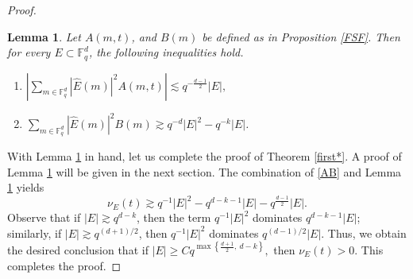 \documentclass[10pt,a4paper]{amsart}
\newtheorem{lemma}{Lemma}
\def\Fq#1{\mathbb{F}_q^{#1}}
\def\pnorm#1#2{|#2|_{#1}}
\begin{document}
\begin{proof}
\begin{lemma}\label{main} Let $A(m,t)$, and $B(m)$ be defined as in Proposition \ref{FSF}.  Then for every $E \subset \Fq{d}$, the following inequalities hold.
\begin{enumerate}
[label=\textup{(\roman*)}, ref=\textup{(\roman*)}]
\item \label{ABC1} $\left|\displaystyle{\sum_{m\in \Fq{d}}\pnorm{}{\widehat{E}(m)}^2}A(m,t)\right| \lesssim q^{-\frac{d-1}{2}}|E|,$
\item \label{ABC2} $\displaystyle{\sum_{m\in \Fq{d}}\pnorm{}{
\widehat{E}(m)}^2}B(m) \gtrsim q^{-d}|E|^2 - q^{-k}|E|$.
\end{enumerate}
\end{lemma}

With Lemma \ref{main} in hand, let us complete the proof of Theorem \ref{first*}. A proof of Lemma \ref{main} will be given in the next section.
The combination of \eqref{AB} and Lemma \ref{main} yields 
\begin{equation*}
	\nu_E(t) \gtrsim q^{-1}|E|^2 -q^{d-k-1}|E|-q^{\frac{d-1}{2}}|E|.
\end{equation*}
Observe that if \( |E| \gtrsim q^{d-k} \), then the term \( q^{-1}|E|^2 \) dominates \( q^{d-k-1}|E| \); similarly, if \( |E| \gtrsim q^{(d+1)/2} \), then \( q^{-1}|E|^2 \) dominates \( q^{(d-1)/2}|E| \). Thus, we obtain the desired conclusion that 
if $|E| \ge C  q^{\max\left\{ \frac{d+1}{2},\ d - k \right\}},$ then  $\nu_E(t) >0.$
This completes the proof.
\end{proof}
\end{document}
